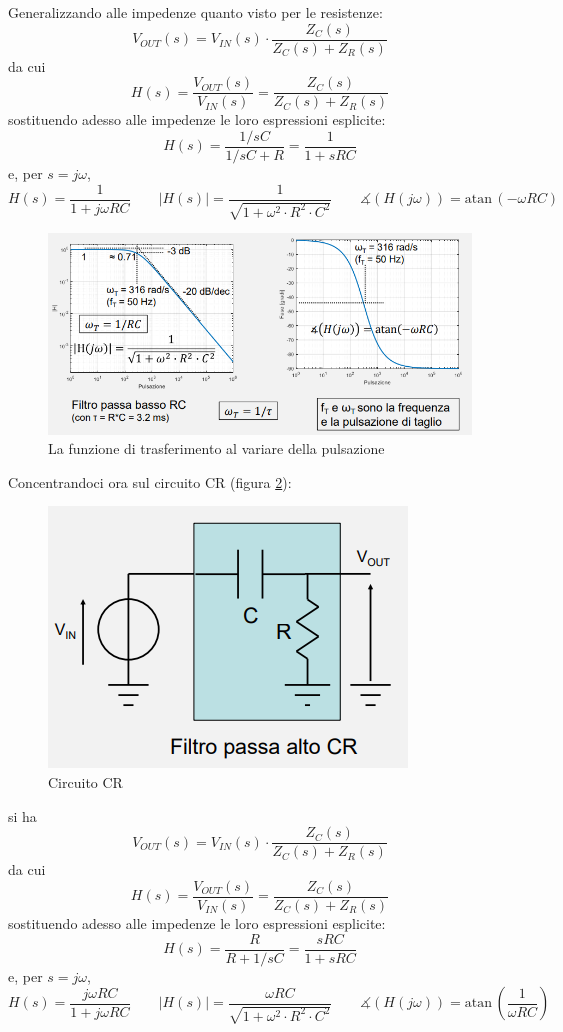 \documentclass{article}
\begin{document}
Generalizzando alle impedenze quanto visto per le resistenze:
\[V_{OUT}(s) = V_{IN}(s) \cdot \frac{Z_C(s)}{Z_C(s) + Z_R(s)}\]
da cui 
\[H(s) = \frac{V_{OUT} (s)}{V_{IN} (s)} = \frac{Z_C(s)}{Z_C(s) + Z_R(s)}\]
sostituendo adesso alle impedenze le loro espressioni esplicite:
\[H(s) = \frac{1/sC}{1/sC + R} = \frac{1}{1 + sRC}\]
e, per $s = j\omega$, 
\[H(s) = \frac{1}{1 + j \omega RC} \quad \quad |H(s)| = \frac{1}{\sqrt{1 + \omega ^2 \cdot R^2 \cdot C^2}} \quad \quad \measuredangle (H(j \omega)) = \textrm{atan}\, (- \omega RC)\]
\begin{figure}[h]
  \centering
  \includegraphics[scale=0.7]{IM_circuito_RC_passivo_grafici}
  \caption{La funzione di trasferimento al variare della pulsazione}
  \label{Schema_circuito_RC_passivo_grafici}
\end{figure}

Concentrandoci ora sul circuito CR (figura \ref{Schema_circuito_CR_passivo}):

\begin{figure}[h]
  \centering
  \includegraphics[scale=0.7]{IM_circuito_CR_passivo}
  \caption{Circuito CR}
  \label{Schema_circuito_CR_passivo}
\end{figure}
si ha
\[V_{OUT}(s) = V_{IN}(s) \cdot \frac{Z_C(s)}{Z_C(s) + Z_R(s)}\]
da cui 
\[H(s) = \frac{V_{OUT} (s)}{V_{IN} (s)} = \frac{Z_C(s)}{Z_C(s) + Z_R(s)}\]
sostituendo adesso alle impedenze le loro espressioni esplicite:
\[H(s) = \frac{R}{R + 1/sC} = \frac{sRC}{1 + sRC}\]
e, per $s = j\omega$, 
\[H(s) = \frac{j \omega RC}{1 + j \omega RC} \quad \quad |H(s)| = \frac{\omega RC}{\sqrt{1 + \omega ^2 \cdot R^2 \cdot C^2}} \quad \quad \measuredangle (H(j \omega)) = \textrm{atan}\, \left(\frac{1}{\omega RC}\right)\]
\end{document}
